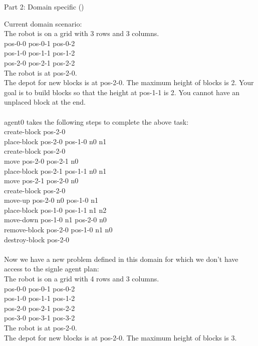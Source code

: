 \newpage

\noindent Part 2: Domain specific (\termes) \\
\begin{tcolorbox}[redbox]
\begin{minipage}{0.95\columnwidth}
Current domain scenario:\\
The robot is on a grid with 3 rows and 3 columns. \\
pos-0-0 pos-0-1 pos-0-2 \\
pos-1-0 pos-1-1 pos-1-2 \\
pos-2-0 pos-2-1 pos-2-2 \\
The robot is at pos-2-0. \\
The depot for new blocks is at pos-2-0. 
The maximum height of blocks is 2. 
Your goal is to build blocks so that the height at pos-1-1 is 2. 
You cannot have an unplaced block at the end.
\\ \\
agent0 takes the following steps to complete the above task:\\
create-block pos-2-0\\
place-block pos-2-0 pos-1-0 n0 n1\\
create-block pos-2-0\\
move pos-2-0 pos-2-1 n0\\
place-block pos-2-1 pos-1-1 n0 n1\\
move pos-2-1 pos-2-0 n0\\
create-block pos-2-0\\
move-up pos-2-0 n0 pos-1-0 n1\\
place-block pos-1-0 pos-1-1 n1 n2\\
move-down pos-1-0 n1 pos-2-0 n0\\
remove-block pos-2-0 pos-1-0 n1 n0\\
destroy-block pos-2-0
\\ \\ 
Now we have a new problem defined in this domain for which we don't have access to the signle agent plan:\\
The robot is on a grid with 4 rows and 3 columns. \\
pos-0-0 pos-0-1 pos-0-2 \\
pos-1-0 pos-1-1 pos-1-2 \\
pos-2-0 pos-2-1 pos-2-2 \\
pos-3-0 pos-3-1 pos-3-2 \\
The robot is at pos-2-0. \\
The depot for new blocks is at pos-2-0. 
The maximum height of blocks is 3. 

\end{minipage}
\end{tcolorbox}
